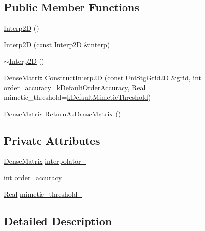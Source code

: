 \subsection*{Public Member Functions}
\begin{DoxyCompactItemize}
\item 
\hyperlink{classmtk_1_1Interp2D_a1ced84c0dbafdbe1cd3732d5a4848e10}{Interp2\-D} ()
\item 
\hyperlink{classmtk_1_1Interp2D_a86af209e6045050e4ebc205dd43b8279}{Interp2\-D} (const \hyperlink{classmtk_1_1Interp2D}{Interp2\-D} \&interp)
\item 
\hyperlink{classmtk_1_1Interp2D_a037ed312b0baa2137a31984108e6907d}{$\sim$\-Interp2\-D} ()
\item 
\hyperlink{classmtk_1_1DenseMatrix}{Dense\-Matrix} \hyperlink{classmtk_1_1Interp2D_ae9a83433caa1fd62956cce0872a02fb8}{Construct\-Interp2\-D} (const \hyperlink{classmtk_1_1UniStgGrid2D}{Uni\-Stg\-Grid2\-D} \&grid, int order\-\_\-accuracy=\hyperlink{group__c01-roots_ga0d95560098eb36420511103637b6952f}{k\-Default\-Order\-Accuracy}, \hyperlink{group__c01-roots_gac080bbbf5cbb5502c9f00405f894857d}{Real} mimetic\-\_\-threshold=\hyperlink{group__c01-roots_ga35718d949bdc81a08a9cc8ebbe3478a2}{k\-Default\-Mimetic\-Threshold})
\item 
\hyperlink{classmtk_1_1DenseMatrix}{Dense\-Matrix} \hyperlink{classmtk_1_1Interp2D_a8ec771bc030c11d0a806b642387d3b32}{Return\-As\-Dense\-Matrix} ()
\end{DoxyCompactItemize}
\subsection*{Private Attributes}
\begin{DoxyCompactItemize}
\item 
\hyperlink{classmtk_1_1DenseMatrix}{Dense\-Matrix} \hyperlink{classmtk_1_1Interp2D_aa30fa30d96c8b0a37adac36c4e344329}{interpolator\-\_\-}
\item 
int \hyperlink{classmtk_1_1Interp2D_ad83cea724e0eff1d8b14bcba3575612e}{order\-\_\-accuracy\-\_\-}
\item 
\hyperlink{group__c01-roots_gac080bbbf5cbb5502c9f00405f894857d}{Real} \hyperlink{classmtk_1_1Interp2D_a842cfa59a56be76a240dd5de68007134}{mimetic\-\_\-threshold\-\_\-}
\end{DoxyCompactItemize}


\subsection{Detailed Description}


